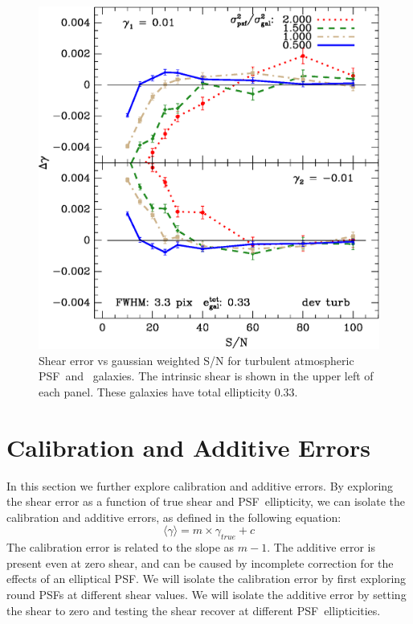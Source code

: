 \documentclass[10pt,preprint]{aastex}
\newcommand{\psf}{PSF}
\begin{document}
\begin{figure}[t] \centering \centering
\includegraphics[scale=0.7]{figures/gmix-fit-dt03r05r06r07r08-yr-0.005-0.005-diff.eps}

 \caption{Shear error vs gaussian weighted S/N for turbulent atmospheric \psf\
 and \devauc\ galaxies. The intrinsic shear is shown in the upper left of each
 panel.  These galaxies have total ellipticity 0.33.  \label{fig:dt03r05r06r07r08}}

\end{figure}


\section{Calibration and Additive Errors}

In this section we further explore calibration and additive errors.  By
exploring the shear error as a function of true shear and \psf\ ellipticity, we
can isolate the calibration and additive errors, as defined in the following
equation:
\begin{equation}
\langle \gamma \rangle = m\times \gamma_{true} + c
\end{equation}
The calibration error is related to the slope as $m-1$.  The additive error is
present even at zero shear, and can be caused by incomplete correction for the
effects of an elliptical \psf.  We will isolate the calibration error by first
exploring round \psf s at different shear values.  We will isolate the additive
error by setting the shear to zero and testing the shear recover at different
\psf\ ellipticities.
\end{document}
